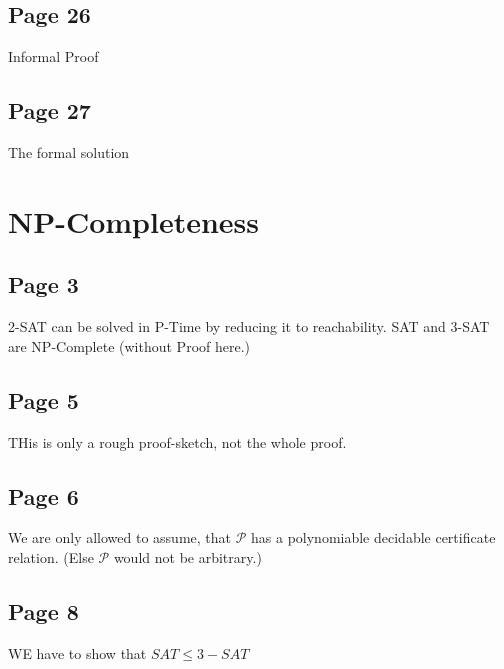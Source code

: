 \documentclass[a4paper]{article}
\begin{document}
\subsection{Page 26}
Informal Proof

\subsection{Page 27}
The formal solution
 \begin{center}
\end{center} 






\section{NP-Completeness}

\subsection{Page 3}

2-SAT can be solved in P-Time by reducing it to reachability. SAT and 3-SAT are
NP-Complete (without Proof here.)


\subsection{Page 5}
THis is only a rough proof-sketch, not the whole proof.

\subsection{Page 6}
We are only allowed to assume, that $\mathcal{P}$ has a polynomiable decidable
certificate relation. (Else $\mathcal{P}$ would not be arbitrary.)


\subsection{Page 8}
WE have to show that $SAT \leq 3-SAT$
\end{document}

